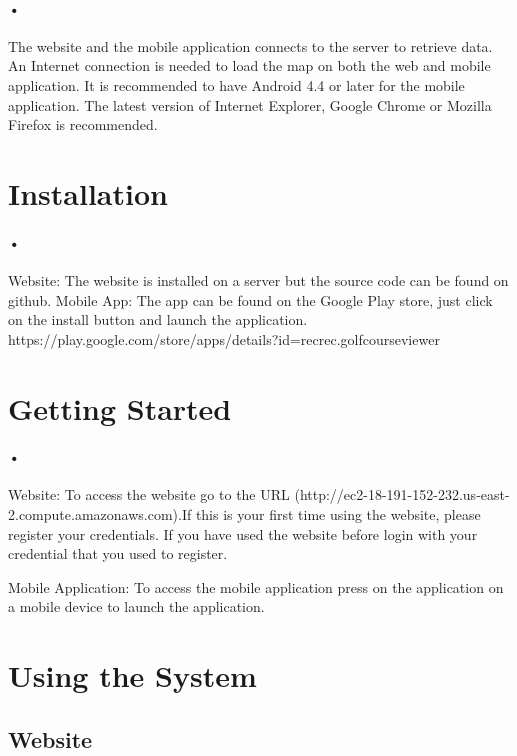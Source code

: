 \documentclass{article}
\begin{document}
	\paragraph{•}
	  The website and the mobile application connects to the server to retrieve data. An Internet connection is needed to load the map on both the web and mobile application. It is recommended to have Android 4.4 or later for the mobile application. The latest version of Internet Explorer, Google Chrome or Mozilla Firefox is recommended.
	  
	  \section{Installation}
	
	  \paragraph{•}
	  Website: The website is installed on a server but the source code can be found on github.
	  Mobile App: The app can be found on the Google Play store, just click on the install button and launch the application. \linebreak https://play.google.com/store/apps/details?id=recrec.golfcourseviewer
	
	\section{Getting Started}
	\paragraph{•}
	
	Website: To access the website go to the URL (http://ec2-18-191-152-232.us-east-2.compute.amazonaws.com).If this is your first time using the website, please register your credentials. If you have used the website before login with your credential that you used to register. 
	
	Mobile Application: To access the mobile application press on the application on a mobile device to launch the application.
	\section{Using the System}
	
	\subsection{Website}
\end{document}
